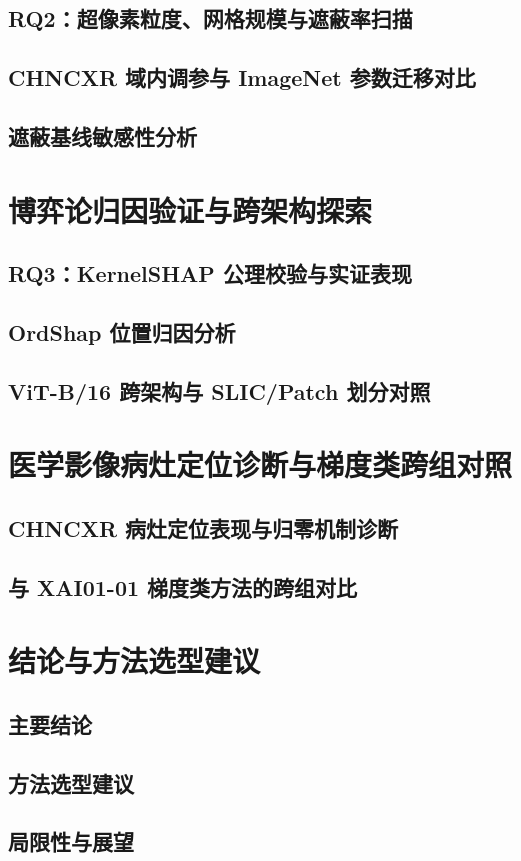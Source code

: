 \section{RQ2：超像素粒度、网格规模与遮蔽率扫描}

\section{CHNCXR 域内调参与 ImageNet 参数迁移对比}

\section{遮蔽基线敏感性分析}

\chapter{博弈论归因验证与跨架构探索}

\section{RQ3：KernelSHAP 公理校验与实证表现}

\section{OrdShap 位置归因分析}

\section{ViT-B/16 跨架构与 SLIC/Patch 划分对照}

\chapter{医学影像病灶定位诊断与梯度类跨组对照}

\section{CHNCXR 病灶定位表现与归零机制诊断}

\section{与 XAI01-01 梯度类方法的跨组对比}

\chapter{结论与方法选型建议}

\section{主要结论}

\section{方法选型建议}

\section{局限性与展望}
